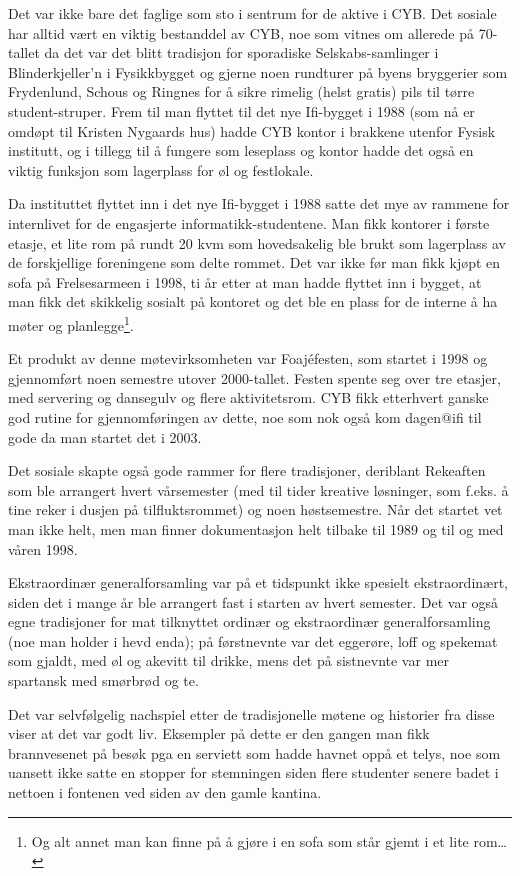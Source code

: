 Det var ikke bare det faglige som sto i sentrum for de aktive i CYB. Det sosiale har alltid vært en viktig bestanddel av CYB, noe som vitnes om allerede på 70-tallet da det var det blitt tradisjon for sporadiske Selskabs-samlinger i Blinderkjeller’n i Fysikkbygget og gjerne noen rundturer på byens bryggerier som Frydenlund, Schous og Ringnes for å sikre rimelig (helst gratis) pils til tørre student-struper. Frem til man flyttet til det nye Ifi-bygget i 1988 (som nå er omdøpt til Kristen Nygaards hus) hadde CYB kontor i brakkene utenfor Fysisk institutt, og i tillegg til å fungere som leseplass og kontor hadde det også en viktig funksjon som lagerplass for øl og festlokale.

Da instituttet flyttet inn i det nye Ifi-bygget i 1988 satte det mye av rammene for internlivet for de engasjerte informatikk-studentene. Man fikk kontorer i første etasje, et lite rom på rundt 20 kvm som hovedsakelig ble brukt som lagerplass av de forskjellige foreningene som delte rommet. Det var ikke før man fikk kjøpt en sofa på Frelsesarmeen i 1998, ti år etter at man hadde flyttet inn i bygget, at man fikk det skikkelig sosialt på kontoret og det ble en plass for de interne å ha møter og planlegge\footnote{Og alt annet man kan finne på å gjøre i en sofa som står gjemt i et lite rom\dots}.

Et produkt av denne møtevirksomheten var Foajéfesten, som startet i 1998 og gjennomført noen semestre utover 2000-tallet. Festen spente seg over tre etasjer, med servering og dansegulv og flere aktivitetsrom. CYB fikk etterhvert ganske god rutine for gjennomføringen av dette, noe som nok også kom dagen@ifi til gode da man startet det i 2003.

Det sosiale skapte også gode rammer for flere tradisjoner, deriblant Rekeaften som ble arrangert hvert vårsemester (med til tider kreative løsninger, som f.eks. å tine reker i dusjen på tilfluktsrommet) og noen høstsemestre. Når det startet vet man ikke helt, men man finner dokumentasjon helt tilbake til 1989 og til og med våren 1998.

Ekstraordinær generalforsamling var på et tidspunkt ikke spesielt ekstraordinært, siden det i mange år ble arrangert fast i starten av hvert semester. Det var også egne tradisjoner for mat tilknyttet ordinær og ekstraordinær generalforsamling (noe man holder i hevd enda); på førstnevnte var det eggerøre, loff og spekemat som gjaldt, med øl og akevitt til drikke, mens det på sistnevnte var mer spartansk med smørbrød og te.

Det var selvfølgelig nachspiel etter de tradisjonelle møtene og historier fra disse viser at det var godt liv. Eksempler på dette er den gangen man fikk brannvesenet på besøk pga en serviett som hadde havnet oppå et telys, noe som uansett ikke satte en stopper for stemningen siden flere studenter senere badet i nettoen i fontenen ved siden av den gamle kantina.

